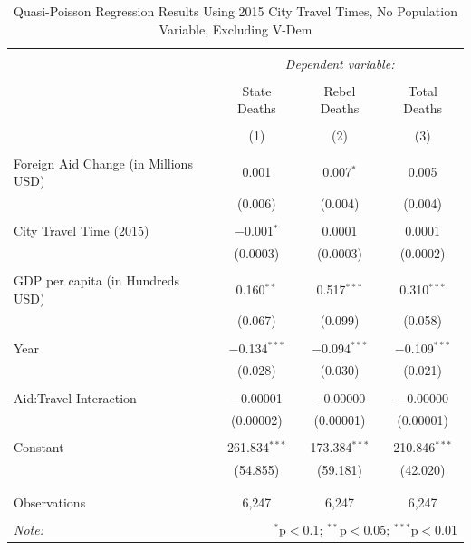 \documentclass[12pt, letterpaper]{article}
\begin{document}
\begin{table}[!htbp] \centering 
	\caption{Quasi-Poisson Regression Results Using 2015 City Travel Times, No Population Variable, Excluding V-Dem } 
	\label{robustyearly2015nopop} 
	\begin{tabular}{@{\extracolsep{5pt}}lccc} 
		\\[-1.8ex]\hline 
		\hline \\[-1.8ex] 
		& \multicolumn{3}{c}{\textit{Dependent variable:}} \\ 
		\cline{2-4} 
		\\[-1.8ex] & State Deaths & Rebel Deaths & Total Deaths \\ 
		\\[-1.8ex] & (1) & (2) & (3)\\ 
		\hline \\[-1.8ex] 
		Foreign Aid Change (in Millions USD) & 0.001 & 0.007$^{*}$ & 0.005 \\ 
		& (0.006) & (0.004) & (0.004) \\ 
		& & & \\ 
		City Travel Time (2015) & $-$0.001$^{*}$ & 0.0001 & 0.0001 \\ 
		& (0.0003) & (0.0003) & (0.0002) \\ 
		& & & \\ 
		GDP per capita (in Hundreds USD) & 0.160$^{**}$ & 0.517$^{***}$ & 0.310$^{***}$ \\ 
		& (0.067) & (0.099) & (0.058) \\ 
		& & & \\ 
		Year & $-$0.134$^{***}$ & $-$0.094$^{***}$ & $-$0.109$^{***}$ \\ 
		& (0.028) & (0.030) & (0.021) \\ 
		& & & \\ 
		Aid:Travel Interaction & $-$0.00001 & $-$0.00000 & $-$0.00000 \\ 
		& (0.00002) & (0.00001) & (0.00001) \\ 
		& & & \\ 
		Constant & 261.834$^{***}$ & 173.384$^{***}$ & 210.846$^{***}$ \\ 
		& (54.855) & (59.181) & (42.020) \\ 
		& & & \\ 
		\hline \\[-1.8ex] 
		Observations & 6,247 & 6,247 & 6,247 \\ 
		\hline 
		\hline \\[-1.8ex] 
		\textit{Note:}  & \multicolumn{3}{r}{$^{*}$p$<$0.1; $^{**}$p$<$0.05; $^{***}$p$<$0.01} \\ 
	\end{tabular} 
\end{table} 
\end{document}
